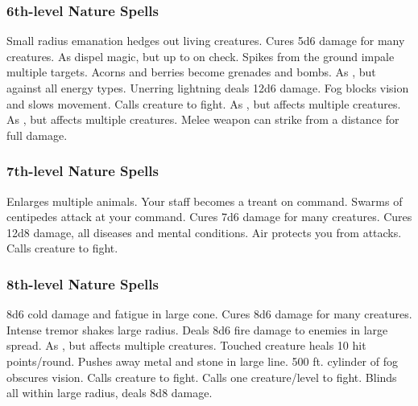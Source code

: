 \subsubsection{6th-level Nature Spells}
\begin{spelllist}
   Small radius emanation hedges out living creatures.
   Cures 5d6 damage for many creatures.
   As dispel magic, but up to  on check.
   Spikes from the ground impale multiple targets.
   Acorns and berries become grenades and bombs.
   As , but against all energy types.
   Unerring lightning deals 12d6 damage.
   Fog blocks vision and slows movement.
   Calls creature to fight.
   As , but affects multiple creatures.
   As , but affects multiple creatures.
   Melee weapon can strike from a distance for full damage.
\end{spelllist}

\subsubsection{7th-level Nature Spells}
\begin{spelllist}
   Enlarges multiple animals.
   Your staff becomes a treant on command.
   Swarms of centipedes attack at your command.
   Cures 7d6 damage for many creatures.
   Cures 12d8 damage, all diseases and mental conditions.
   Air protects you from attacks. 
   Calls creature to fight.
\end{spelllist}

\subsubsection{8th-level Nature Spells}
\begin{spelllist}
   8d6 cold damage and fatigue in large cone.
   Cures 8d6 damage for many creatures.
   Intense tremor shakes large radius.
   Deals 8d6 fire damage to enemies in large spread.
   As , but affects multiple creatures.
   Touched creature heals 10 hit points/round.
   Pushes away metal and stone in large line.
   500 ft. cylinder of fog obscures vision.
   Calls creature to fight.
   Calls one creature/level to fight.
   Blinds all within large radius, deals 8d8 damage.
\end{spelllist}

